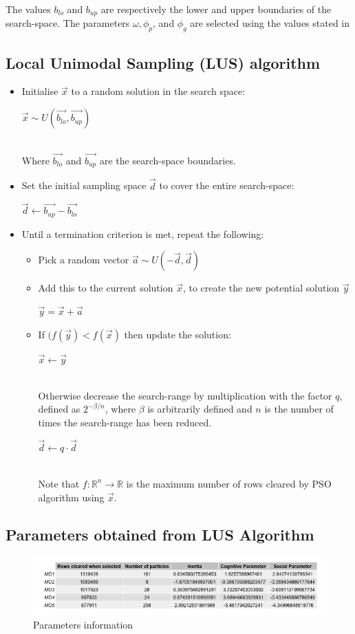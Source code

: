 \documentclass[12pt]{article}
\numberwithin{table}{section}
\numberwithin{figure}{section}
\newcommand{\R}{\mathbb{R}}
\begin{document}
The values $b_{lo}$ and $b_{up}$ are respectively the lower and upper boundaries of the search-space. The parameters $\omega, \phi_p$, and $\phi_g$ are selected using the values stated in \cite{VanDenBergh2006ATrajectories} 

\subsection{Local Unimodal Sampling (LUS) algorithm}\label{app:lus}
\begin{itemize}
\item Initialise $\vec{x}$ to a random solution in the search space:
\\
\centerline{$\vec{x} \sim U(\vec{b_{lo}}, \vec{b_{up}})$}
\\
Where $\vec{b_{lo}}$ and $\vec{b_{up}}$ are the search-space boundaries.
\item Set the initial sampling space $\vec{d}$ to cover the entire search-space:
\\
\centerline{$\vec{d} \leftarrow \vec{b_{up}} - \vec{b_{lo}}$}
\item Until a termination criterion is met, repeat the following: 
	\begin{itemize}
	\item Pick a random vector $\vec{a} \sim U(-\vec{d}, \vec{d})$
    \item Add this to the current solution $\vec{x}$, to create the new potential solution $\vec{y}$
    \centerline {$\vec{y} = \vec{x} + \vec{a}$}
    \item If $(f(\vec{y}) < f(\vec{x})$ then update the solution:
    \\
    \centerline{$ \vec{x} \leftarrow \vec{y}$}
    \\
    Otherwise decrease the search-range by multiplication with the factor $q$, defined as $2^{-\beta / n}$, where $\beta$ is arbitrarily defined and $n$ is the number of times the search-range has been reduced.
    \\
    \centerline{$\vec{d} \leftarrow q \cdot \vec{d}$}
    \\
    Note that $f:\R^n \rightarrow \R $ is the maximum number of rows cleared by PSO algorithm using $\vec{x}$.
	\end{itemize}
\end{itemize}

\subsection{Parameters obtained from LUS Algorithm}
\begin{figure}[H]
\centering
\includegraphics[scale = 0.7]{MOParameters.png}
\caption{Parameters information}
\label{fig:parameters-info}
\end{figure}
\end{document}
